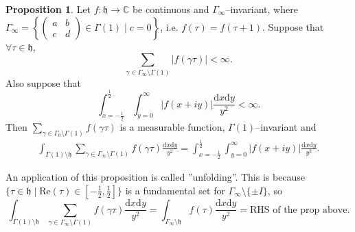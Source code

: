 \documentclass{article}
\theoremstyle{definition}
\newtheorem{prop}[theorem]{Proposition}
\begin{document}
\begin{prop}
    Let $f : \mathfrak{h} \to \mathbb{C}$ be continuous and $\Gamma_{\infty}$--invariant, where $\Gamma_{\infty} = \left\{\begin{pmatrix} a & b \\ c & d  \end{pmatrix} \in \Gamma(1) \mid c = 0\right\}$, i.e. $f(\tau)=f(\tau+1)$. Suppose that $\forall \tau \in \mathfrak{h}$, $$\sum_{\gamma \in \Gamma_\infty \setminus \Gamma(1)} |f(\gamma \tau)| < \infty.$$
    Also suppose that $$\int_{x=-\frac{1}{2}}^{\frac{1}{2}} \int_{y=0}^{\infty} |f(x+iy)|\frac{\mathrm{d}x\mathrm{d}y}{y^2} < \infty.$$
    Then $\sum_{\gamma \in \Gamma_0\setminus \Gamma(1)}^{} f(\gamma \tau)$ is a measurable function, $\Gamma(1)$--invariant and 
    \begin{align*}
        \int_{\Gamma(1)\setminus \mathfrak{h}}^{} \sum_{\gamma \in \Gamma_\infty \setminus \Gamma(1)}^{} f(\gamma \tau)\frac{\mathrm{d}x\mathrm{d}y}{y^2} = \int_{x=-\frac{1}{2}}^{\frac{1}{2}} \int_{y=0}^{\infty} |f(x+iy)|\frac{\mathrm{d}x\mathrm{d}y}{y^2}.
    \end{align*}
\end{prop}
An application of this proposition is called ''unfolding''. This is because $\{\tau \in \mathfrak{h}\mid \text{Re}(\tau) \in [-\frac{1}{2},\frac{1}{2}]\}$ is a fundamental set for $\Gamma_{\infty}\setminus \{\pm I\}$, so \[
\int_{\Gamma(1)\setminus \mathfrak{h}}^{} \sum_{\gamma \in \Gamma_{\infty}\setminus \Gamma(1)}^{} f(\gamma \tau) \frac{\mathrm{d}x\mathrm{d}y}{y^2} = \int_{\Gamma_{\infty}\setminus \mathfrak{h}}^{} f(\tau)\frac{\mathrm{d}x\mathrm{d}y}{y^2} = \text{RHS of the prop above}.
\]
\end{document}
